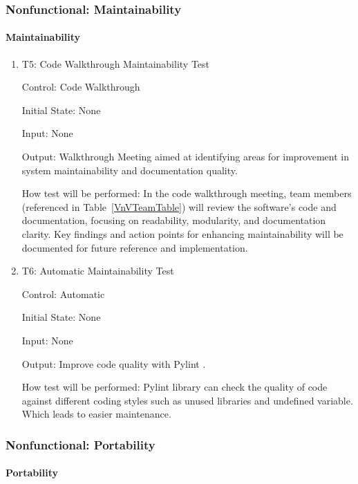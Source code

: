 \documentclass[12pt, titlepage]{article}
\begin{document}
\subsubsection{Nonfunctional: Maintainability} \label{NFMaintainablity}
		
\paragraph{Maintainability}

\begin{enumerate}

  \item{T5: Code Walkthrough Maintainability Test\\}

  Control: Code Walkthrough
  
  Initial State: None
  
  Input: None
  
  Output: Walkthrough Meeting aimed at identifying areas for improvement in 
  system maintainability and documentation quality.

  How test will be performed: In the code walkthrough meeting, team members 
  (referenced in Table~\ref{VnVTeamTable}) will review the software's code and documentation, 
  focusing on readability, modularity, and documentation clarity. Key findings and action 
  points for enhancing maintainability will be documented for future reference and implementation.

  \item{T6: Automatic Maintainability Test\\}

  Control: Automatic
  
  Initial State: None
  
  Input: None
  
  Output: Improve code quality with Pylint \citep{pylint}.

  How test will be performed: Pylint \citep{pylint} library can check the quality of code 
  against different coding styles such as unused libraries
  and undefined variable. Which leads to easier maintenance.
\end{enumerate}

\subsubsection{Nonfunctional: Portability} \label{NFPortablity}
		
\paragraph{Portability}
\end{document}
